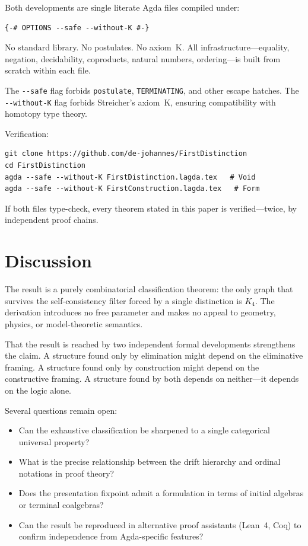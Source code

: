 \documentclass[11pt,a4paper]{article}
\theoremstyle{definition}
\begin{document}
Both developments are single literate Agda files compiled under:

\begin{lstlisting}
{-# OPTIONS --safe --without-K #-}
\end{lstlisting}

\noindent No standard library.  No postulates.  No axiom~K.  All
infrastructure---equality, negation, decidability, coproducts, natural
numbers, ordering---is built from scratch within each file.

The \texttt{-{}-safe} flag forbids \texttt{postulate}, \texttt{TERMINATING},
and other escape hatches.  The \texttt{-{}-without-K} flag forbids
Streicher's axiom~K, ensuring compatibility with homotopy type theory.

\medskip
\noindent Verification:
\begin{lstlisting}
git clone https://github.com/de-johannes/FirstDistinction
cd FirstDistinction
agda --safe --without-K FirstDistinction.lagda.tex   # Void
agda --safe --without-K FirstConstruction.lagda.tex   # Form
\end{lstlisting}

\noindent If both files type-check, every theorem stated in this paper
is verified---twice, by independent proof chains.

\section{Discussion}
\label{sec:discussion}

The result is a purely combinatorial classification theorem: the only
graph that survives the self-consistency filter forced by a single distinction
is $K_4$.  The derivation introduces no free parameter and makes no
appeal to geometry, physics, or model-theoretic semantics.

That the result is reached by two independent formal developments
strengthens the claim.  A structure found only by elimination might depend
on the eliminative framing.  A structure found only by construction might
depend on the constructive framing.  A structure found by both depends on
neither---it depends on the logic alone.

Several questions remain open:

\begin{itemize}[nosep]
  \item Can the exhaustive classification be sharpened to a single
        categorical universal property?
  \item What is the precise relationship between the drift hierarchy
        and ordinal notations in proof theory?
  \item Does the presentation fixpoint admit a formulation in terms of
        initial algebras or terminal coalgebras?
  \item Can the result be reproduced in alternative proof assistants
        (Lean~4, Coq) to confirm independence from Agda-specific features?
\end{itemize}
\end{document}
